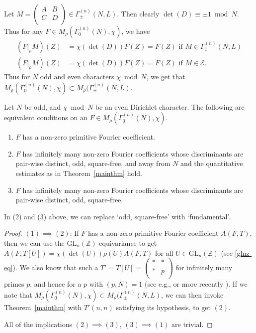 \documentclass[11pt]{amsart}
\numberwithin{equation}{section}
\newcommand{\mbb}{\mathbb}
\newcommand{\mc}{\mathcal}
\newcommand{\mrm}{\mathrm} %
\newcommand{\smat}[4]{\left( \begin{smallmatrix} #1 & #2 \\ #3 & #4 \\ \end{smallmatrix} \right)}
\newcommand{\glnz}{\mrm{GL}_n( \mbb Z)}
\begin{document}
Let $M=\smat{A}{B}{C}{D}\in \Gamma_{\pm}^{(n)}(N, L)$. Then clearly $\det(D)\equiv \pm 1\bmod N$. Thus for any $F\in M_\rho(\Gamma_0^{(n)}(N), \chi)$, we have
\begin{align}\label{chi-inv}
    (F|_\rho M)(Z)&= \chi(\det(D))  F(Z)= F (Z)\text{ if } M\in \Gamma_1^{(n)}(N,L)\\
    (F|_\rho M )(Z)&= \chi(\det(D)) F(Z)= F(Z) \text{ if } M\in \mc E.
\end{align}
Thus for $N$ odd and even characters $\chi\bmod N$, we get that $M_\rho(\Gamma_0^{(n)}(N), \chi)\subset M_\rho(\Gamma_\pm ^{(n)}(N,L)$.


\begin{theorem} \label{eq-cond}
   Let $N$ be odd, and  $\chi \bmod N$ be an even Dirichlet character. The following are equivalent conditions on an $F \in M_{\rho}(\Gamma_{0}^{(n)}(N), \chi)$.
    \begin{enumerate}
        \item 
        $F$ has a non-zero primitive Fourier coefficient.
        \item 
        $F$ has  infinitely many non-zero Fourier coefficients whose discriminants are pair-wise distinct, odd, square-free, and away from $N$ and the quantitative estimates as in Theorem~\ref{mainthm} hold.
        \item 
        $F$ has  infinitely many non-zero Fourier coefficients whose discriminants are pair-wise distinct, odd, square-free.
    \end{enumerate}
      In (2) and (3) above, we can replace `odd, square-free' with `fundamental'.
\end{theorem}
\begin{proof}
    $(1) \implies (2)$: If $F$ has a non-zero primitive Fourier coefficient $A(F,T)$, then we can use the $\glnz$ equivariance to get $A(F,T[U])=\chi(\det(U))\rho(U)A(F,T)$ for all $U \in \glnz$ (see \ref{glnz-eq}). We also know that such a $T'=T[U]=\smat{*}{*}{*}{p}$ for infinitely many primes $p$, and hence for a $p$ with $(p,N)=1$ (see e.g., \cite{pleasants1966representation} or more recently \cite{martin2025prime}). If we note that $M_\rho(\Gamma_0^{(n)}(N), \chi)\subset M_\rho(\Gamma_\pm ^{(n)}(N,L)$, we can then invoke Theorem~\ref{mainthm} with $T'(n,n)$ satisfying its hypothesis, to get $(2)$.

All of the implications $(2) \implies (3)$, $(3) \implies (1)$ are trivial.
\end{proof}
\end{document}
